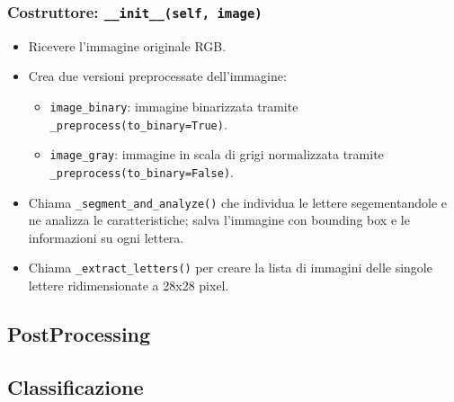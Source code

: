\subsubsection*{Costruttore: \texttt{\_\_init\_\_(self, image)}}
\begin{itemize}
    \item Ricevere l'immagine originale RGB.
    \item Crea due versioni preprocessate dell'immagine:
    \begin{itemize}
        \item \texttt{image\_binary}: immagine binarizzata tramite \\\texttt{\_preprocess(to\_binary=True)}.
        \item \texttt{image\_gray}: immagine in scala di grigi normalizzata tramite \texttt{\_preprocess(to\_binary=False)}.
    \end{itemize}
    \item Chiama \texttt{\_segment\_and\_analyze()} che individua le lettere segementandole e ne analizza le caratteristiche; salva l'immagine con bounding box e le informazioni su ogni lettera.
    \item Chiama \texttt{\_extract\_letters()} per creare la lista di immagini delle singole lettere ridimensionate a 28x28 pixel.
\end{itemize}
\subsection{PostProcessing}
\subsection{Classificazione}
